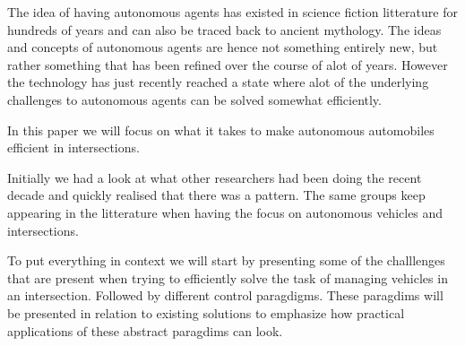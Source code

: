 The idea of having autonomous agents has existed in science fiction litterature for hundreds of years and can also be traced back to ancient mythology.
The ideas and concepts of autonomous agents are hence not something entirely new, but rather something that has been refined over the course of alot of years.
However the technology has just recently reached a state where alot of the underlying challenges to autonomous agents can be solved somewhat efficiently.

In this paper we will focus on what it takes to make autonomous automobiles efficient in intersections.

Initially we had a look at what other researchers had been doing the recent decade and quickly realised that there was a pattern. 
The same groups keep appearing in the litterature when having the focus on autonomous vehicles and intersections.

To put everything in context we will start by presenting some of the challlenges that are present when trying to efficiently solve the task of managing vehicles in an intersection.
Followed by different control paragdigms.
These paragdims will be presented in relation to existing solutions to emphasize how practical applications of these abstract paragdims can look. 
